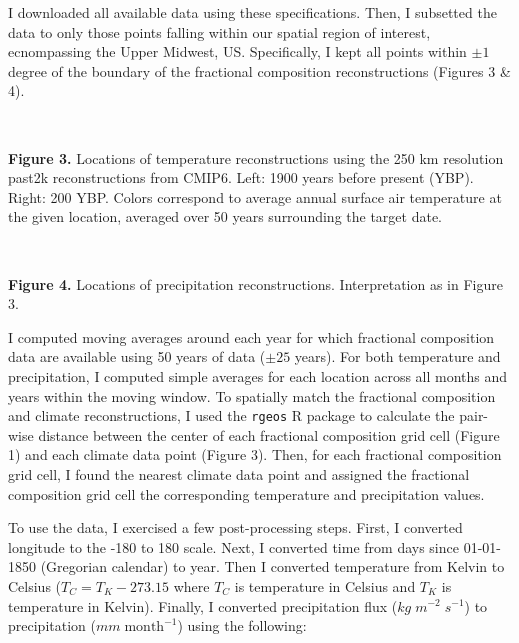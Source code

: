 \documentclass[11pt]{article}
\begin{document}
I downloaded all available data using these specifications. Then, I
subsetted the data to only those points falling within our spatial
region of interest, ecnompassing the Upper Midwest, US. Specifically, I
kept all points within \(\pm 1\) degree of the boundary of the
fractional composition reconstructions (Figures 3 \& 4).
 
            
    
    \begin{center}
    \end{center}
    { \hspace*{\fill} \\}
    

    \textbf{Figure 3.} Locations of temperature reconstructions using the
250 km resolution past2k reconstructions from CMIP6. Left: 1900 years
before present (YBP). Right: 200 YBP. Colors correspond to average
annual surface air temperature at the given location, averaged over 50
years surrounding the target date.
 
            
    
    \begin{center}
    \end{center}
    { \hspace*{\fill} \\}
    

    \textbf{Figure 4.} Locations of precipitation reconstructions.
Interpretation as in Figure 3.

    I computed moving averages around each year for which fractional
composition data are available using 50 years of data (\(\pm 25\)
years). For both temperature and precipitation, I computed simple
averages for each location across all months and years within the moving
window. To spatially match the fractional composition and climate
reconstructions, I used the \texttt{rgeos} R package to calculate the
pair-wise distance between the center of each fractional composition
grid cell (Figure 1) and each climate data point (Figure 3). Then, for
each fractional composition grid cell, I found the nearest climate data
point and assigned the fractional composition grid cell the
corresponding temperature and precipitation values.

To use the data, I exercised a few post-processing steps. First, I
converted longitude to the -180 to 180 scale. Next, I converted time
from days since 01-01-1850 (Gregorian calendar) to year. Then I
converted temperature from Kelvin to Celsius (\(T_C = T_K - 273.15\)
where \(T_C\) is temperature in Celsius and \(T_K\) is temperature in
Kelvin). Finally, I converted precipitation flux
(\(kg \; m^{-2} \; s^{-1}\)) to precipitation
(\(mm \; \text{month}^{-1}\)) using the following:
\end{document}
